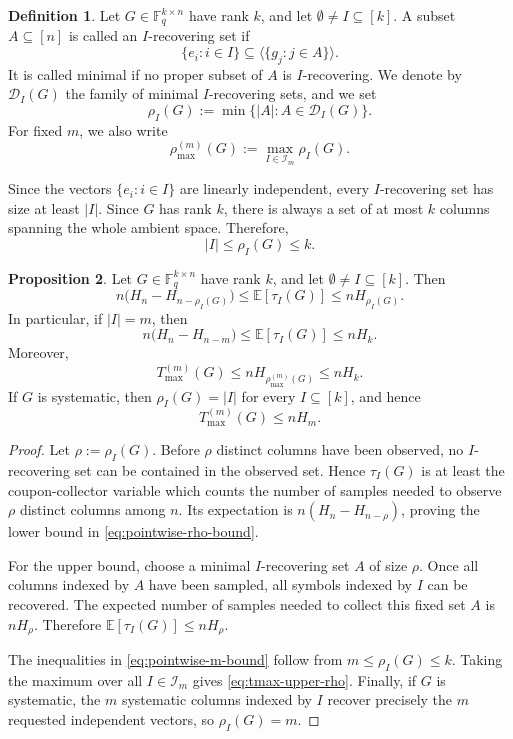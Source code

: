 \documentclass[11pt,a4paper]{article}
\numberwithin{equation}{section}
\theoremstyle{definition}
\newtheorem{definition}{Definition}[section]
\theoremstyle{definition}
\newtheorem{proposition}[definition]{Proposition}
\newcommand{\F}{\mathbb{F}}
\newcommand{\E}{\mathbb{E}}
\newcommand{\cI}{\mathcal{I}}
\newcommand{\cD}{\mathcal{D}}
\newcommand{\Tmax}{T_{\max}}
\begin{document}
\begin{definition}\label{def:minimal-recovering-sets}
Let $G\in \F_q^{k\times n}$ have rank $k$, and let $\emptyset\neq I\subseteq [k]$.  A subset $A\subseteq [n]$ is called an $I$-recovering set if
\[
\{e_i:i\in I\}\subseteq \langle\{g_j:j\in A\}\rangle.
\]
It is called minimal if no proper subset of $A$ is $I$-recovering.  We denote by $\cD_I(G)$ the family of minimal $I$-recovering sets, and we set
\[
\rho_I(G):=\min\{|A|:A\in \cD_I(G)\}.
\]
For fixed $m$, we also write
\[
\rho_{\max}^{(m)}(G):=\max_{I\in \cI_m}\rho_I(G).
\]
\end{definition}

Since the vectors $\{e_i:i\in I\}$ are linearly independent, every $I$-recovering set has size at least $|I|$.  Since $G$ has rank $k$, there is always a set of at most $k$ columns spanning the whole ambient space.  Therefore,
\[
|I|\leq \rho_I(G)\leq k.
\]

\begin{proposition}\label{prop:pointwise-bounds}
Let $G\in \F_q^{k\times n}$ have rank $k$, and let $\emptyset\neq I\subseteq [k]$.  Then
\begin{equation}\label{eq:pointwise-rho-bound}
n\bigl(H_n-H_{n-\rho_I(G)}\bigr)
\leq
\E[\tau_I(G)]
\leq
nH_{\rho_I(G)}.
\end{equation}
In particular, if $|I|=m$, then
\begin{equation}\label{eq:pointwise-m-bound}
n\bigl(H_n-H_{n-m}\bigr)
\leq
\E[\tau_I(G)]
\leq
nH_k.
\end{equation}
Moreover,
\begin{equation}\label{eq:tmax-upper-rho}
\Tmax^{(m)}(G)\leq nH_{\rho_{\max}^{(m)}(G)}\leq nH_k.
\end{equation}
If $G$ is systematic, then $\rho_I(G)=|I|$ for every $I\subseteq [k]$, and hence
\begin{equation}\label{eq:systematic-upper}
\Tmax^{(m)}(G)\leq nH_m.
\end{equation}
\end{proposition}

\begin{proof}
Let $\rho:=\rho_I(G)$.  Before $\rho$ distinct columns have been observed, no $I$-recovering set can be contained in the observed set.  Hence $\tau_I(G)$ is at least the coupon-collector variable which counts the number of samples needed to observe $\rho$ distinct columns among $n$.  Its expectation is $n(H_n-H_{n-\rho})$, proving the lower bound in \eqref{eq:pointwise-rho-bound}.

For the upper bound, choose a minimal $I$-recovering set $A$ of size $\rho$.  Once all columns indexed by $A$ have been sampled, all symbols indexed by $I$ can be recovered.  The expected number of samples needed to collect this fixed set $A$ is $nH_\rho$.  Therefore $\E[\tau_I(G)]\leq nH_\rho$.

The inequalities in \eqref{eq:pointwise-m-bound} follow from $m\leq \rho_I(G)\leq k$.  Taking the maximum over all $I\in \cI_m$ gives \eqref{eq:tmax-upper-rho}.  Finally, if $G$ is systematic, the $m$ systematic columns indexed by $I$ recover precisely the $m$ requested independent vectors, so $\rho_I(G)=m$.
\end{proof}
\end{document}
